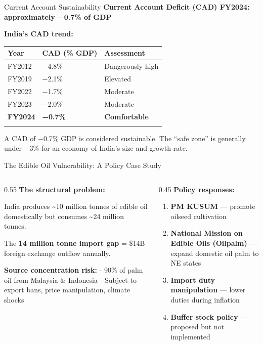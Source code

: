 \documentclass[
  ignorenonframetext,
  aspectratio=169,
]{beamer}
\makeatletter
\providecommand{\tightlist}{%
  \setlength{\itemsep}{0pt}\setlength{\parskip}{0pt}}
\let\quarto@originallabel\label
\DeclareRobustCommand*{\label}[1]{\quarto@originallabel{#1}}
\makeatother
\begin{document}
\begin{frame}{Current Account Sustainability}
\label{current-account-sustainability}
\textbf{Current Account Deficit (CAD) FY2024: approximately −0.7\% of
GDP}

\textbf{India's CAD trend:}

\begin{longtable}[]{@{}lll@{}}
\toprule\noalign{}
Year & CAD (\% GDP) & Assessment \\
\midrule\noalign{}
\endhead
FY2012 & −4.8\% & Dangerously high \\
FY2019 & −2.1\% & Elevated \\
FY2022 & −1.7\% & Moderate \\
FY2023 & −2.0\% & Moderate \\
\textbf{FY2024} & \textbf{−0.7\%} & \textbf{Comfortable} \\
\bottomrule\noalign{}
\end{longtable}

A CAD of −0.7\% GDP is considered sustainable. The ``safe zone'' is
generally under −3\% for an economy of India's size and growth rate.
\end{frame}

\begin{frame}{The Edible Oil Vulnerability: A Policy Case Study}
\label{the-edible-oil-vulnerability-a-policy-case-study}
\begin{columns}[T]
\begin{column}{0.55\linewidth}
\textbf{The structural problem:}

India produces \textasciitilde10 million tonnes of edible oil
domestically but consumes \textasciitilde24 million tonnes.

The \textbf{14 million tonne import gap} = \$14B foreign exchange
outflow annually.

\textbf{Source concentration risk:} - 90\% of palm oil from Malaysia \&
Indonesia - Subject to export bans, price manipulation, climate shocks
\end{column}

\begin{column}{0.45\linewidth}
\textbf{Policy responses:}

\begin{enumerate}
\tightlist
\item
  \textbf{PM KUSUM} --- promote oilseed cultivation
\item
  \textbf{National Mission on Edible Oils (Oilpalm)} --- expand domestic
  oil palm to NE states
\item
  \textbf{Import duty manipulation} --- lower duties during inflation
\item
  \textbf{Buffer stock policy} --- proposed but not implemented
\end{enumerate}
\end{column}
\end{columns}
\end{frame}
\end{document}
